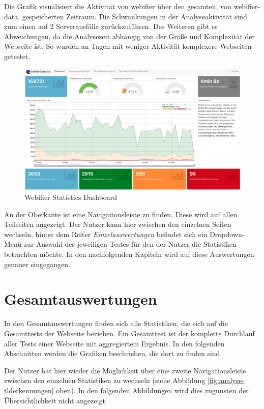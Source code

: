 Die Grafik visualisiert die Aktivität von webifier über den gesamten, von webifier-data, gespeicherten Zeitraum. Die Schwankungen in der Analyseaktivität sind zum einen auf 2 Serverausfälle zurückzuführen. Des Weiteren gibt es Abweichungen, da die Analysezeit abhängig von der Größe und Komplexität der Webseite ist. So wurden an Tagen mit weniger Aktivität komplexere Webseiten getestet.
\begin{figure}[H]
  \centering
  \includegraphics[width=15cm]{images/stats/dashboard}
  \caption[Webifier Statistics Dashboard]{Webifier Statistics Dashboard\protect\footnotemark}
  \label{fig:analyse-dashboard}
\end{figure}

An der Oberkante ist eine Navigationsleiste zu finden. Diese wird auf allen Teilseiten angezeigt. Der Nutzer kann hier zwischen den einzelnen Seiten wechseln, hinter dem Reiter \textit{Einzelauswertungen} befindet sich ein Dropdown-Menü zur Auswahl des jeweiligen Testes für den der Nutzer die Statistiken betrachten möchte. In den nachfolgenden Kapiteln wird auf diese Auswertungen genauer eingegangen.

\section{Gesamtauswertungen}
In den Gesamtauswertungen finden sich alle Statistiken, die sich auf die Gesamttests der Webseite beziehen. Ein Gesamttest ist der komplette Durchlauf aller Tests einer Webseite mit aggregiertem Ergebnis. In den folgenden Abschnitten werden die Grafiken beschrieben, die dort zu finden sind.

Der Nutzer hat hier wieder die Möglichkeit über eine zweite Navigationsleiste zwischen den einzelnen
Statistiken zu wechseln (siehe Abbildung \ref{fig:analyse-tlderkennungen} oben). In den folgenden
Abbildungen wird dies zugunsten der Übersichtlichkeit nicht angezeigt.

